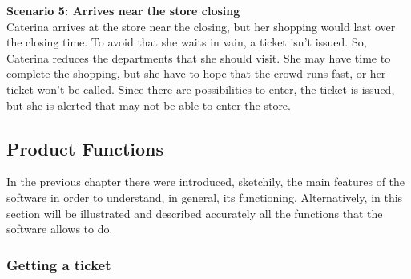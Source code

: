 \documentclass{article}
\begin{document}
	{\bfseries Scenario 5: Arrives near the store closing} \\
	Caterina arrives at the store near the closing, but her shopping would last over the closing time. To avoid that she waits in vain, a ticket isn't issued. So, Caterina reduces the departments that she should visit. She may have time to complete the shopping, but she have to hope that the crowd runs fast, or her ticket won't be called. Since there are possibilities to enter, the ticket is issued, but she is alerted that may not be able to enter the store.
	\newpage
	\subsection{Product Functions}
		
	In the previous chapter there were introduced, sketchily, the main features of the software in order to understand, in general, its functioning. Alternatively, in this section will be illustrated and described accurately all the functions that the software allows to do.
	
		\subsubsection{Getting a ticket}
		
\end{document}
